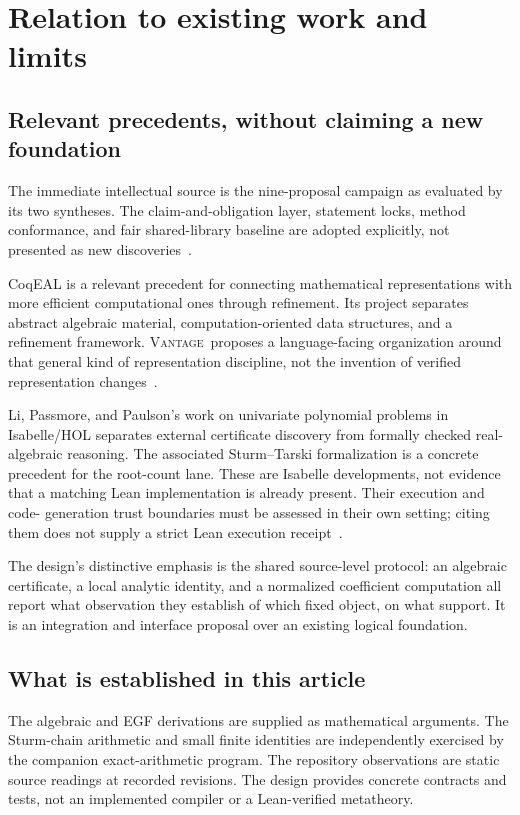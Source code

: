 \documentclass[11pt,a4paper]{article}
\newcommand{\Vantage}{\textsc{Vantage}}
\theoremstyle{definition}
\begin{document}
\section{Relation to existing work and limits}\label{sec:prior}
\subsection{Relevant precedents, without claiming a new foundation}
The immediate intellectual source is the nine-proposal campaign as evaluated by
its two syntheses. The claim-and-obligation layer, statement locks, method
conformance, and fair shared-library baseline are adopted explicitly, not
presented as new discoveries~\cite{synthesis,blueprints}.

CoqEAL is a relevant precedent for connecting mathematical representations with
more efficient computational ones through refinement. Its project separates
abstract algebraic material, computation-oriented data structures, and a
refinement framework. \Vantage\ proposes a language-facing organization around
that general kind of representation discipline, not the invention of verified
representation changes~\cite{coqeal}.

Li, Passmore, and Paulson's work on univariate polynomial problems in Isabelle/HOL
separates external certificate discovery from formally checked real-algebraic
reasoning. The associated Sturm--Tarski formalization is a concrete precedent
for the root-count lane. These are Isabelle developments, not evidence that a
matching Lean implementation is already present. Their execution and code-
generation trust boundaries must be assessed in their own setting; citing them
does not supply a strict Lean execution receipt~\cite{univariate,sturm}.

The design's distinctive emphasis is the shared source-level protocol: an
algebraic certificate, a local analytic identity, and a normalized coefficient
computation all report what observation they establish of which fixed object,
on what support. It is an integration and interface proposal over an existing
logical foundation.

\subsection{What is established in this article}
The algebraic and EGF derivations are supplied as mathematical arguments. The
Sturm-chain arithmetic and small finite identities are independently exercised
by the companion exact-arithmetic program. The repository observations are
static source readings at recorded revisions. The design provides concrete
contracts and tests, not an implemented compiler or a Lean-verified metatheory.
\end{document}
